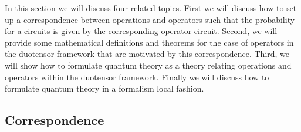\documentclass[10pt]{article}
\begin{document}
In this section we will discuss four related topics.  First we will discuss how to set up a correspondence between operations and operators such that the probability for a circuits is given by the corresponding operator circuit. Second, we will provide some mathematical definitions and theorems for the case of operators in the duotensor framework that are motivated by this correspondence.  Third, we will show how to formulate quantum theory as a theory relating operations and operators within the duotensor framework.  Finally we will discuss how to formulate quantum theory in a formalism local fashion.

\subsection{Correspondence}
\end{document}
